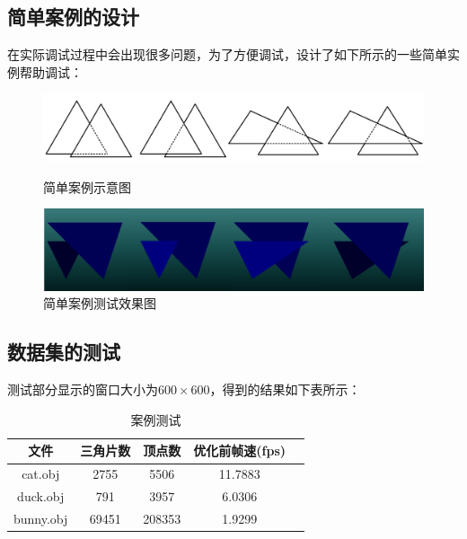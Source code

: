\documentclass[10pt]{article}
\begin{document}
\subsection{简单案例的设计}
在实际调试过程中会出现很多问题，为了方便调试，设计了如下所示的一些简单实例帮助调试：
\begin{figure}[H]
\setlength{\abovecaptionskip}{2pt}
\setlength{\belowcaptionskip}{20pt}
\begin{center}
\includegraphics[scale=0.6]{cases1.png}
\caption{简单案例示意图}
\includegraphics[scale=0.5]{cases2.png}
\caption{简单案例测试效果图}
\end{center}
\end{figure}

\subsection{数据集的测试}
测试部分显示的窗口大小为$600\times600$，得到的结果如下表所示：
\begin{table}[H]
\caption{案例测试}
\begin{center}
\begin{tabular}{ccccc}
\toprule  %
文件&三角片数&顶点数&优化前帧速(fps)\\
\midrule  %
cat.obj&2755&5506&11.7883 \\
duck.obj&791&3957& 6.0306\\
bunny.obj&69451&208353&1.9299\\
\bottomrule %
\end{tabular}
\end{center}
\end{table}
\end{document}
